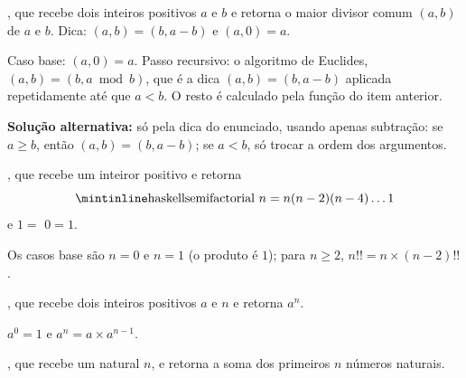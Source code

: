 {{\begin{Qlist}
        \item[(d)] , que recebe dois inteiros 
            positivos $a$ e $b$ e retorna o maior divisor comum $(a, b)$ de $a$ e $b$.
            Dica: $(a, b) = (b, a - b)$ e $(a, 0) = a$.

        \begin{solution}
        Caso base: $(a,0)=a$. Passo recursivo: o algoritmo de Euclides, $(a,b)=(b,a \bmod b)$,
        que é a dica $(a,b)=(b,a-b)$ aplicada repetidamente até que $a<b$. O resto é calculado
        pela função  do item anterior.


        \textbf{Solução alternativa:} só pela dica do enunciado, usando apenas subtração: se $a\geq b$, então $(a,b)=(b,a-b)$; se $a<b$, só trocar a ordem dos argumentos.

        \end{solution}

        \item[(e)] , que recebe um inteiror positivo e
            retorna
        \[
            \mbox{\code{haskell}{semifactorial} $n$} = n(n - 2)(n - 4)\ldots 1
        \]
        e  $1 = $  $0 = 1$.

        \begin{solution}
        Os casos base são $n=0$ e $n=1$ (o produto é $1$); para $n\geq 2$,
        $n!! = n\times (n-2)!!$.

        \end{solution}

        \item[(f)] , que recebe dois inteiros positivos
            $a$ e $n$ e retorna $a^n$.

        \begin{solution}
        $a^0=1$ e $a^n = a\times a^{n-1}$.

        \end{solution}

        \item[(g)] , que recebe um natural $n$, e retorna 
            a soma dos primeiros $n$ números naturais.


\end{Qlist}}}
